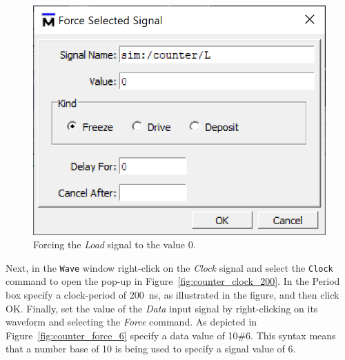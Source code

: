 \documentclass[11pt, twoside, pdftex]{article}
\begin{document}
\begin{figure}[H]
   \begin{center}
      \includegraphics[scale=.75]{figures/counter_force_0.png}
       \caption{Forcing the {\it Load} signal to the value 0.} 
	 \label{fig:counter_force_0}
	 \end{center}
\end{figure}

Next, in the \texttt{Wave} window right-click on the {\it Clock} signal and select the 
\texttt{Clock} command to open the pop-up in Figure~\ref{fig:counter_clock_200}. In the {\sf Period} box
specify a clock-period of 200~ns, as illustrated in the figure, and then click {\sf OK}. Finally, set the
value of the {\it Data} input signal by right-clicking on its waveform and selecting the {\it Force} command.
As depicted in Figure~\ref{fig:counter_force_6} specify a data value of 10\#6. This syntax means that a number
base of 10 is being used to specify a signal value of 6.
\end{document}
